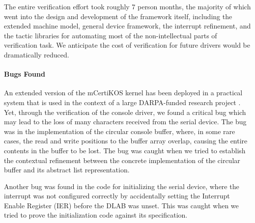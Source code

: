 The entire verification effort took roughly 7 person months, the
majority of which went into the design and development of the
framework itself, including the extended machine model, general device
framework, the interrupt refinement, and the tactic libraries for
automating most of the non-intellectual parts of verification task.
We anticipate the cost of verification for future drivers would be
dramatically reduced.

\paragraph{Bugs Found}
An extended version of the mCertiKOS kernel has been deployed in a
practical system that is used in the context of a large DARPA-funded
research project \cite{dscal15}.  Yet, through the verification of the
console driver, we found a critical bug which may lead to the loss of
many characters received from the serial device. The bug was in the
implementation of the circular console buffer, where, in some rare
cases, the read and write positions to the buffer array overlap,
causing the entire contents in the buffer to be lost. The bug was
caught when we tried to establish the contextual refinement between
the concrete implementation of the circular buffer and its abstract
list representation.

Another bug was found in the code for initializing the serial device,
where the interrupt was not configured correctly by accidentally
setting the Interrupt Enable Register (IER) before the DLAB was unset.
This was caught when we tried to prove the initialization code against
its specification.



